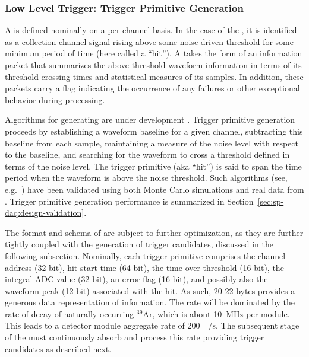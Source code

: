 \subsubsection{Low Level Trigger: Trigger Primitive Generation}
\label{sec:sp-daq:design-trigger-primitives}

A  is defined nominally on a per-channel basis. In the case of
the , it is identified as a collection-channel signal rising above some
noise-driven threshold for some minimum period of time (here called a
``hit'').
A  takes the form of an information packet that 
summarizes the above-threshold waveform information in terms of its
threshold crossing times and statistical measures of its  samples. 
In addition, these packets carry a flag indicating the occurrence of any
failures or other exceptional behavior during  processing.


Algorithms for generating  are under development
\cite{bib:docdb11275}.  Trigger primitive generation proceeds
by establishing a waveform baseline
for a given channel, subtracting this baseline from each sample, maintaining
a measure of the noise level with respect to the baseline, and searching for the waveform to cross a
threshold defined in terms of the noise level. 
The  trigger primitive  (aka ``hit'') is said to span the time period when the waveform is above the noise threshold.
Such algorithms (see, e.g.~\cite{bib:docdb11236}) have been validated
using both Monte Carlo simulations and 
real data from . 
Trigger primitive generation performance is summarized in
Section~\ref{sec:sp-daq:design-validation}.

The format and schema of  are subject to further
optimization, as they are further tightly coupled with the generation of
trigger candidates, discussed in the following subsection. Nominally,
each trigger primitive comprises the channel address (32 bit), hit
start time (64 bit), the time over
threshold (16 bit), the integral ADC value (32 bit), an error flag (16
bit), and possibly also
the waveform peak (12 bit) associated with the hit. 
As such, 20-22 bytes provides a generous data
representation of  information. 
The  rate will be dominated by the rate of decay of naturally occurring
$^{39}$Ar, which is about \SI{10}{\mega\hertz} per module.
This leads to a detector module aggregate rate of
\SI{200}{\mega\byte/\second}.
The subsequent stage of the  must continuously absorb and process this
rate providing trigger candidates as described next.

